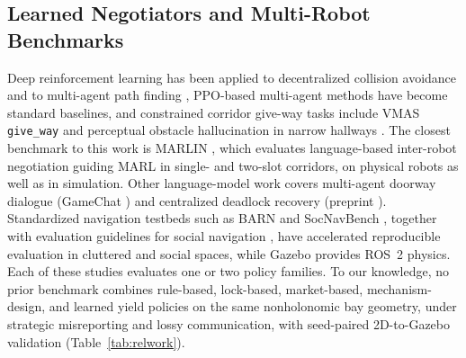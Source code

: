\subsection{Learned Negotiators and Multi-Robot Benchmarks}
Deep reinforcement learning has been applied to decentralized collision avoidance \cite{chen2017cadrl,long2018towards,fan2020distributed} and to multi-agent path finding \cite{sartoretti2019primal,li2020graph}, PPO-based multi-agent methods \cite{yu2022mappo} have become standard baselines, and constrained corridor give-way tasks include VMAS \texttt{give\_way} \cite{vmasgiveway,bettini2023heterogeneous} and perceptual obstacle hallucination in narrow hallways \cite{park2023hallucination}. The closest benchmark to this work is MARLIN \cite{marlin2024}, which evaluates language-based inter-robot negotiation guiding MARL in single- and two-slot corridors, on physical robots as well as in simulation. Other language-model work covers multi-agent doorway dialogue (GameChat \cite{gamechat2025}) and centralized deadlock recovery (preprint \cite{garg2024llm}). Standardized navigation testbeds such as BARN \cite{xiao2022barn} and SocNavBench \cite{biswas2022socnavbench}, together with evaluation guidelines for social navigation \cite{francis2025principles}, have accelerated reproducible evaluation in cluttered and social spaces, while Gazebo \cite{gazebosim} provides ROS~2 physics. Each of these studies evaluates one or two policy families. To our knowledge, no prior benchmark combines rule-based, lock-based, market-based, mechanism-design, and learned yield policies on the same nonholonomic bay geometry, under strategic misreporting and lossy communication, with seed-paired 2D-to-Gazebo validation (Table~\ref{tab:relwork}).

